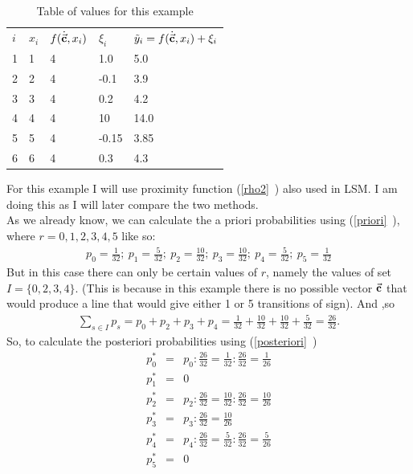 \begin{table}[h!]
\caption {Table of values for this example} \label{tab:title} 
\centering
\begin{tabular}{lllll}
$i$ & $x_{i}$ & $f(\dot{\vec{\textbf{c}}},x_{i})$ & $\xi_{i}$  & $\tilde{y}_{i}=f(\dot{\vec{\textbf{c}}},x_{i})+\xi_{i}$  \\
1 & 1 & 4      & 1.0   & 5.0   \\
2 & 2 & 4      & -0.1  & 3.9   \\
3 & 3 & 4      & 0.2   & 4.2   \\
4 & 4 & 4      & 10    & 14.0  \\
5 & 5 & 4      & -0.15 & 3.85  \\
6 & 6 & 4      & 0.3   & 4.3  
\end{tabular}
\end{table}
\noindent
For this example I will use proximity function (\vref{rho2}~) also used in LSM. I am doing this as I will later compare the two methods.\\
\noindent
As we already know, we can calculate the a priori probabilities using (\vref{priori}~), where $r=0,1,2,3,4,5$ like so:
\begin{gather*}
p_{0}= \frac{1}{32}; \ p_{1}= \frac{5}{32}; \ p_{2}= \frac{10}{32}; \ p_{3}= \frac{10}{32}; \ p_{4}= \frac{5}{32}; \ p_{5}= \frac{1}{32}
\end{gather*}
But in this case there can only be certain values of $r$, namely the values of set $I=\{0,2,3,4\}$. (This is because in this example there is no possible vector $\vec{\textbf{c}}$ that would produce a line that would give either 1 or 5 transitions of sign). And ,so 
\begin{gather*}
\sum\limits_{s \in I}p_{s}=p_{0}+p_{2}+p_{3}+p_{4}= \frac{1}{32} + \frac{10}{32} + \frac{10}{32} + \frac{5}{32} = \frac{26}{32}.
\end{gather*}
So, to calculate the posteriori probabilities using (\vref{posteriori}~)
\begin{eqnarray*}
p_{0}^{*} &=& p_{0}: \frac{26}{32} = \frac{1}{32} : \frac{26}{32} = \frac{1}{26} \\
p_{1}^{*} &=& 0 \\
p_{2}^{*} &=& p_{2}: \frac{26}{32} = \frac{10}{32} : \frac{26}{32} = \frac{10}{26} \\
p_{3}^{*} &=& p_{3}: \frac{26}{32} = \frac{10}{26} \\
p_{4}^{*} &=& p_{4}: \frac{26}{32} = \frac{5}{32} : \frac{26}{32} = \frac{5}{26} \\
p_{5}^{*} &=& 0
\end{eqnarray*}
